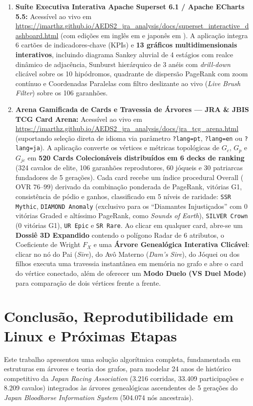 \documentclass[conference]{IEEEtran}
\begin{document}
\begin{enumerate}
    \item \textbf{Suíte Executiva Interativa Apache Superset 6.1 / Apache ECharts 5.5:} Acessível ao vivo em \url{https://imarthz.github.io/AEDS2_jra_analysis/docs/superset_interactive_dashboard.html} (com edições em inglês em  e japonês em ). A aplicação integra 6 cartões de indicadores-chave (KPIs) e \textbf{13 gráficos multidimensionais interativos}, incluindo diagrama Sankey aluvial de 4 estágios com realce dinâmico de adjacência, Sunburst hierárquico de 3 anéis com \textit{drill-down} clicável sobre os 10 hipódromos, quadrante de dispersão PageRank com zoom contínuo e Coordenadas Paralelas com filtro deslizante ao vivo (\textit{Live Brush Filter}) sobre os 106 garanhões.
    \item \textbf{Arena Gamificada de Cards e Travessia de Árvores --- JRA \& JBIS TCG Card Arena:} Acessível ao vivo em \url{https://imarthz.github.io/AEDS2_jra_analysis/docs/jra_tcg_arena.html} (suportando seleção direta de idioma via parâmetro \texttt{?lang=pt}, \texttt{?lang=en} ou \texttt{?lang=ja}). A aplicação converte os vértices e métricas topológicas de $G_c$, $G_p$ e $G_{jc}$ em \textbf{520 Cards Colecionáveis distribuídos em 6 decks de ranking} (324 cavalos de elite, 106 garanhões reprodutores, 60 jóqueis e 30 patriarcas fundadores de 5 gerações). Cada card recebe um índice procedural Overall ($\text{OVR } 76\text{--}99$) derivado da combinação ponderada de PageRank, vitórias G1, consistência de pódio e ganhos, classificado em 5 níveis de raridade: \texttt{SSR Mythic}, \texttt{DIAMOND Anomaly} (exclusivo para os ``Diamantes Injustiçados'' com 0 vitórias Graded e altíssimo PageRank, como \textit{Sounds of Earth}), \texttt{SILVER Crown} (0 vitórias G1), \texttt{UR Epic} e \texttt{SR Rare}. Ao clicar em qualquer card, abre-se um \textbf{Dossiê 3D Expandido} contendo o polígono Radar de 6 atributos, o Coeficiente de Wright $F_X$ e uma \textbf{Árvore Genealógica Interativa Clicável}: clicar no nó do Pai (\textit{Sire}), do Avô Materno (\textit{Dam's Sire}), do Jóquei ou dos filhos executa uma travessia instantânea em memória no grafo e abre o card do vértice conectado, além de oferecer um \textbf{Modo Duelo (VS Duel Mode)} para comparação de dois vértices frente a frente.
\end{enumerate}

\section{Conclusão, Reprodutibilidade em Linux e Próximas Etapas}
Este trabalho apresentou uma solução algorítmica completa, fundamentada em estruturas em árvores e teoria dos grafos, para modelar 24 anos de histórico competitivo da \textit{Japan Racing Association} (3.216 corridas, 33.409 participações e 8.209 cavalos) integrados às árvores genealógicas ascendentes de 5 gerações do \textit{Japan Bloodhorse Information System} (504.074 nós ancestrais).
\end{document}

